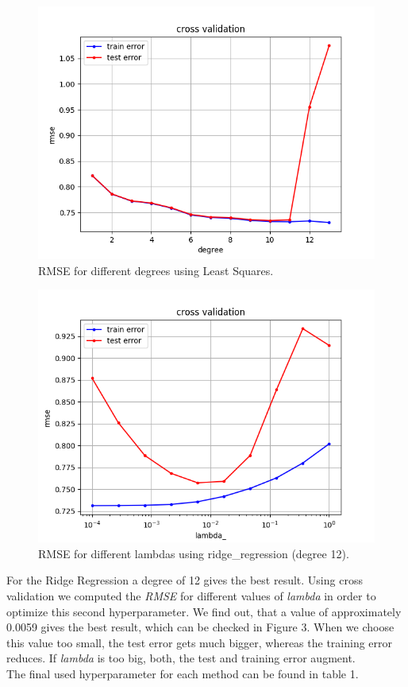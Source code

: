 \documentclass[10pt,conference,compsocconf]{IEEEtran}
\begin{document}
\begin{figure}[htbp]
  \centering
  \includegraphics[width=\columnwidth]{cross_validation_leastsquares.png}
  \caption{RMSE for different degrees using Least Squares.}
  \vspace{-3mm}
  \label{fig:crossvalidationleastsquares}
\end{figure}


\begin{figure}[htbp]
	\centering
	\includegraphics[width=\columnwidth]{cross_validation_ridge_degree_12.png}
	\caption{RMSE for different lambdas using ridge\_regression (degree 12).}
	\vspace{-3mm}
	\label{fig:crossvalidationridge}
\end{figure}
 For the Ridge Regression a degree of 12 gives the best result. Using cross validation we computed the \textit{RMSE} for different values of \textit{lambda} in order to optimize this second hyperparameter. We find out, that a value of approximately 0.0059 gives the best result, which can be checked in Figure 3. When we choose this value too small, the test error gets much bigger, whereas the training error reduces. If \textit{lambda} is too big, both, the test and training error augment.\\
 The final used hyperparameter for each method can be found in table 1.\\
\end{document}

